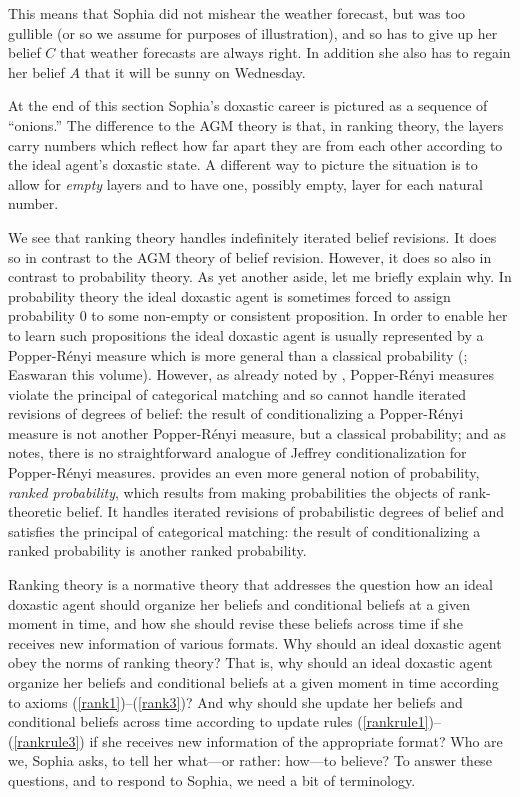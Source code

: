 This means that Sophia did not mishear the weather forecast, but was too gullible (or so we assume for purposes of illustration), and so has to give up her belief $C$ that weather forecasts are always right. In addition she also has to regain her belief $A$ that it will be sunny on Wednesday.

At the end of this section Sophia's doxastic career is pictured as a sequence of ``onions.'' The difference to the AGM theory is that, in ranking theory, the layers carry numbers which reflect how far apart they are from each other according to the ideal agent's doxastic state. A different way to picture the situation is to allow for \emph{empty} layers and to have one, possibly empty, layer for each natural number.

We see that ranking theory handles indefinitely iterated belief revisions. It does so in contrast to the AGM theory of belief revision. However, it does so also in contrast to probability theory. As yet another aside, let me briefly explain why. In probability theory the ideal doxastic agent is sometimes forced to assign probability $0$ to some non-empty or consistent proposition. In order to enable her to learn such propositions the ideal doxastic agent is usually represented by a Popper-R\'enyi measure which is more general than a classical probability (\citealp{p55, r55, s70, s86}; Easwaran this volume). However, as already noted by \citet{h76a}, Popper-R\'enyi measures violate the principal of categorical matching and so cannot handle iterated revisions of degrees of belief: the result of conditionalizing a Popper-R\'enyi measure is not another Popper-R\'enyi measure, but a classical probability; and as \citet{b95} notes, there is no straightforward analogue of Jeffrey conditionalization for Popper-R\'enyi measures. \citet{s06a} provides an even more general notion of probability, \emph{ranked probability}, which results from making probabilities the objects of rank-theoretic belief. It handles iterated revisions of probabilistic degrees of belief and satisfies the principal of categorical matching: the result of conditionalizing a ranked probability is another ranked probability.

Ranking theory is a normative theory that addresses the question how an ideal doxastic agent should organize her beliefs and conditional beliefs at a given moment in time, and how she should revise these beliefs across time if she receives new information of various formats. Why should an ideal doxastic agent obey the norms of ranking theory? That is, why should an ideal doxastic agent organize her beliefs and conditional beliefs at a given moment in time according to axioms (\ref{rank1})--(\ref{rank3})? And why should she update her beliefs and conditional beliefs across time according to update rules (\ref{rankrule1})--(\ref{rankrule3}) if she receives new information of the appropriate format? Who are we, Sophia asks, to tell her what---or rather: how---to believe? To answer these questions, and to respond to Sophia, we need a bit of terminology.

